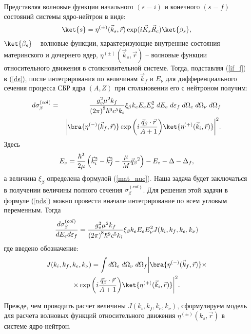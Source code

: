 Представляя волновые функции начального $(s=i)$ и конечного $(s=f)$
состояний системы ядро-нейтрон в виде:
\begin{eqnarray}\label{if_f}
\ket{s}= \eta^{(\pm)}(\vec k_s, \vec r)\exp(i \vec K_s \vec R_c) \ket{ \beta_s},
\end{eqnarray}
$\ket{ \beta_s}$ -- волновые функции, характеризующие внутренние состояния
материнского и дочернего ядер,
$\eta^{(\pm)}(\vec k_s, \vec r)$ -- волновые функции относительного движения
в столкновительной системе. Тогда, подставляя (\ref{if_f}) в (\ref{ds}),
после интегрирования по величинам $\vec k_f$ и $E_\nu$
для дифференциального сечения процесса СБР ядра $(A,Z)$ при столкновении
его с нейтроном получим:
\begin{eqnarray}\label{nds}
d\sigma^{(col)}_\beta&=&
{{g_v^2 \mu ^2 k_f}\over{{(2\pi)}^8 \hbar^9 c^5 k_i}} \xi_\beta k_e E_e
E^2_\nu \; dE_e \; d\varepsilon_f \; d\Omega_e \; d\Omega_{\nu}\; d\Omega_f \nonumber \\
&&\bigg| \bra {\eta^{(-)} (\vec k_f, \vec r)} \exp \bigg(i{{\vec q_\beta \cdot \vec r}\over{A+1}}\bigg)
\ket {\eta^{(+)} (\vec k_i, \vec r)}\bigg|^2.
\end{eqnarray}
Здесь
$$
E_{\nu}={\hbar^2 \over 2 \mu}\left({\vec k_i}^2 - {\vec k_f}^2 -{\mu \over M} \vec q_\beta{}^2\right)
-E_e-\Delta-\Delta_f,
$$
а величина $\xi_\beta$ определена формулой (\ref{mat_nuc}). Наша задача будет
заключаться в получении величины полного сечения $\sigma_\beta^{(col)}$.
Для решения этой задачи в формуле (\ref{nds}) можно провести вначале интегрирование
по всем угловым переменным. Тогда
\begin{equation}\label{s_b}
{d\sigma^{(col)}_\beta \over
d E_e d \varepsilon_f}
=
{{g_v^2 \mu ^2 k_f}\over{{(2\pi)}^8 \hbar^9 c^5 k_i}} \xi_\beta k_e E_e
E^2_\nu J(k_i,k_f,k_e,k_\nu)
\end{equation}
где введено обозначение:
\begin{multline}\label{J2}
J(k_i,k_f,k_e,k_\nu)=\int  d\Omega_e \; d\Omega_{\nu}\; d\Omega_f
\bigg| \bra {\eta^{(-)} (\vec k_f, \vec r)} \times\\
\times\exp \bigg(i{{\vec q_\beta \cdot \vec r}\over{A+1}}\bigg)
\ket {\eta^{(+)} (\vec k_i, \vec r)}\bigg|^2.
\end{multline}

Прежде, чем проводить расчет величины $J(k_i,k_f,k_e,k_\nu)$, сформулируем
модель для расчета волновых функций относительного движения
$\eta^{(\pm)} (k_s,\vec r)$ в системе ядро-нейтрон.

